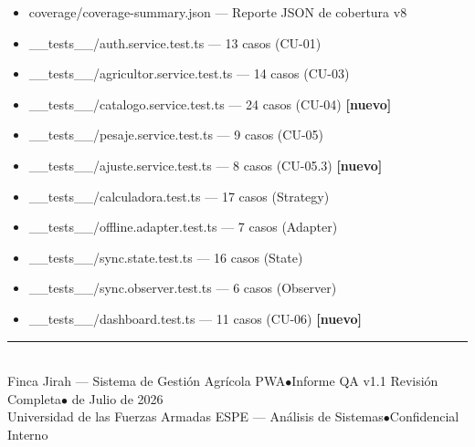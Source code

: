 \documentclass[12pt, a4paper]{article}
\newcommand{\code}[1]{\colorbox{CCodeBg}{\color{CCode}\ttfamily\small #1}}
\begin{document}
\begin{itemize}[leftmargin=1.5em, itemsep=4pt]
  \item \code{coverage/coverage-summary.json} --- Reporte JSON de cobertura v8
  \item \code{\_\_tests\_\_/auth.service.test.ts} --- 13 casos (CU-01)
  \item \code{\_\_tests\_\_/agricultor.service.test.ts} --- 14 casos (CU-03)
  \item \code{\_\_tests\_\_/catalogo.service.test.ts} --- 24 casos (CU-04) \textbf{[nuevo]}
  \item \code{\_\_tests\_\_/pesaje.service.test.ts} --- 9 casos (CU-05)
  \item \code{\_\_tests\_\_/ajuste.service.test.ts} --- 8 casos (CU-05.3) \textbf{[nuevo]}
  \item \code{\_\_tests\_\_/calculadora.test.ts} --- 17 casos (Strategy)
  \item \code{\_\_tests\_\_/offline.adapter.test.ts} --- 7 casos (Adapter)
  \item \code{\_\_tests\_\_/sync.state.test.ts} --- 16 casos (State)
  \item \code{\_\_tests\_\_/sync.observer.test.ts} --- 6 casos (Observer)
  \item \code{\_\_tests\_\_/dashboard.test.ts} --- 11 casos (CU-06) \textbf{[nuevo]}
\end{itemize}

\vfill
\begin{center}
  {\color{CBorder}\rule{\textwidth}{0.4pt}}\\[6pt]
  {\color{CTextMuted}\small Finca Jirah --- Sistema de Gestión Agrícola PWA\quad $\bullet$\quad Informe QA v1.1 Revisión Completa\quad $\bullet$ de Julio de 2026}\\
  {\color{CTextMuted}\small Universidad de las Fuerzas Armadas ESPE --- Análisis de Sistemas\quad $\bullet$\quad Confidencial Interno}
\end{center}
\end{document}
